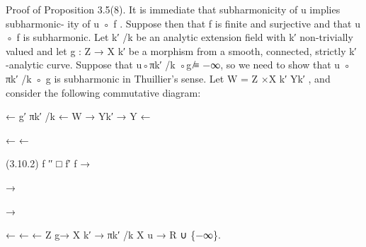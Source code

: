 \documentclass[
  10pt,
]{article}
\newenvironment{Shaded}{}{}
\newcommand{\NormalTok}[1]{#1}
\begin{document}
\begin{Shaded}
\begin{Highlighting}[]
\NormalTok{Proof of Proposition 3.5(8). It is immediate that subharmonicity of u implies subharmonic{-}}
\NormalTok{ity of u ◦ f . Suppose then that f is finite and surjective and that u ◦ f is subharmonic. Let}
\NormalTok{k′ /k be an analytic extension field with k′ non{-}trivially valued and let g : Z → X k′ be a}
\NormalTok{morphism from a smooth, connected, strictly k′ {-}analytic curve. Suppose that u◦πk′ /k ◦g ̸≡}
\NormalTok{−∞, so we need to show that u ◦ πk′ /k ◦ g is subharmonic in Thuillier’s sense. Let}
\NormalTok{W = Z ×X k′ Yk′ , and consider the following commutative diagram:}

\NormalTok{                                   ←   g′           πk′ /k}
\NormalTok{                                                    ←}
\NormalTok{                          W             → Yk′           → Y}
\NormalTok{                           ←}




\NormalTok{                                                             ←}
\NormalTok{                                            ←}




\NormalTok{(3.10.2)                f ′′           □       f′                f}
\NormalTok{                          →}



\NormalTok{                                            →}



\NormalTok{                                                             →}




\NormalTok{                                   ←                ←                ←}
\NormalTok{                               Z       g→   X k′        →}
\NormalTok{                                                    πk′ /k   X           u → R ∪ \{−∞\}.}



\end{Highlighting}
\end{Shaded}
\end{document}
